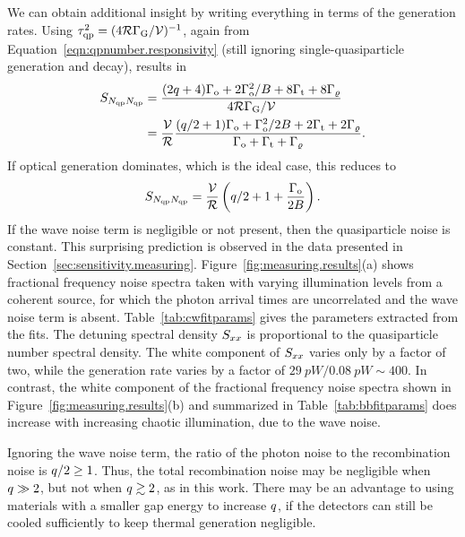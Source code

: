 We can obtain additional insight by writing everything in terms of the generation rates.
Using
$\tau_{\mathrm{qp}}^2 = (4 \mathcal{R} \Gamma_{\mathrm{G}} / \mathcal{V})^{-1}$, again from Equation~\ref{eqn:qpnumber.responsivity} (still ignoring single-quasiparticle generation and decay), results in
\begin{align}
\begin{split}
S_{N_{\mathrm{qp}} N_{\mathrm{qp}}}
  &=
  \frac
  {(2 q + 4) \Gamma_{\mathrm{o}} + 2 \Gamma_{\mathrm{o}}^2 / B
  + 8 \Gamma_{\mathrm{t}} + 8 \Gamma_\varrho}
  {4 \mathcal{R} \Gamma_{\mathrm{G}} / \mathcal{V}} \\
  &=
  \frac{\mathcal{V}}{\mathcal{R}}
  \frac{(q / 2 + 1) \Gamma_{\mathrm{o}} + \Gamma_{\mathrm{o}}^2 / 2 B
  + 2 \Gamma_{\mathrm{t}} + 2 \Gamma_\varrho}
  {\Gamma_{\mathrm{o}} + \Gamma_{\mathrm{t}} + \Gamma_\varrho}.
\end{split}
\label{eqn:spectraldensity_qpnumber_generation}
\end{align}
If optical generation dominates, which is the ideal case, this reduces to
\begin{equation}
S_{N_{\mathrm{qp}} N_{\mathrm{qp}}}
  =
  \frac{\mathcal{V}}{\mathcal{R}}
  \left( q / 2 + 1 + \frac{\Gamma_{\mathrm{o}}}{2 B} \right).
\label{eqn:spectraldensity_qpnumber_optical}
\end{equation}
If the wave noise term is negligible or not present, then the quasiparticle noise is constant.
This surprising prediction is observed in the data presented in Section~\ref{sec:sensitivity.measuring}.
Figure~\ref{fig:measuring.results}(a) shows fractional frequency noise spectra taken with varying illumination levels from a coherent source, for which the photon arrival times are uncorrelated and the wave noise term is absent.
Table~\ref{tab:cwfitparams} gives the parameters extracted from the fits.
The detuning spectral density $S_{x x}$ is proportional to the quasiparticle number spectral density.
The white component of $S_{x x}$ varies only by a factor of two, while the generation rate varies by a factor of
$\SI{29}{pW} / \SI{0.08}{pW} \sim 400$.
In contrast, the white component of the fractional frequency noise spectra shown in Figure~\ref{fig:measuring.results}(b) and summarized in Table~\ref{tab:bbfitparams} does increase with increasing chaotic illumination, due to the wave noise.

Ignoring the wave noise term, the ratio of the photon noise to the recombination noise is $q / 2 \ge 1$.
Thus, the total recombination noise may be negligible when $q \gg 2$, but not when $q \gtrsim 2$, as in this work.
There may be an advantage to using materials with a smaller gap energy to increase $q$, if the detectors can still be cooled sufficiently to keep thermal generation negligible.

